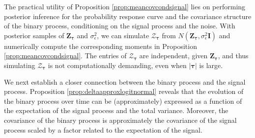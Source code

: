 
The practical utility of Proposition \ref{prop:meancovcondsignal} lies on performing 
posterior inference for the probability response curve and the covariance structure of 
the binary process, conditioning on the signal process and the noise. With posterior 
samples of $\mathbf{Z}_{\boldsymbol{\tau}}$ and $\sigma^2_{\epsilon}$, we can 
simulate $\boldsymbol{\mathcal{Z}}_{\boldsymbol{\tau}}$ 
from $N(\mathbf{Z}_{\boldsymbol{\tau}},\sigma^2_{\epsilon}\mathbf{I})$ and numerically 
compute the corresponding moments in Proposition \ref{prop:meancovcondsignal}. 
The entries of $\boldsymbol{\mathcal{Z}}_{\boldsymbol{\tau}}$ are independent, given 
$\mathbf{Z}_{\boldsymbol{\tau}}$, and thus simulating 
$\boldsymbol{\mathcal{Z}}_{\boldsymbol{\tau}}$ is not computationally demanding, 
even when $|\boldsymbol{\tau}|$ is large. 


We next establish a closer connection between the binary process and the signal process.  
Proposition \ref{prop:deltaapproxlogitnormal} reveals that the evolution of the binary process 
over time can be (approximately) expressed as a function of the expectation of the signal 
process and the total variance. Moreover, the covariance of the binary process is approximately 
the covariance of the signal process scaled by a factor related to the expectation of the signal. 


